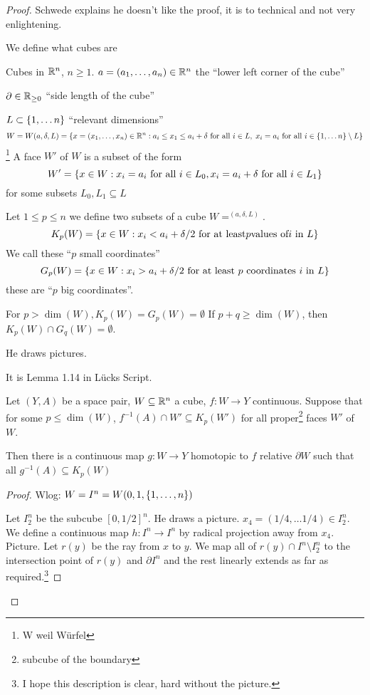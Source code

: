 \documentclass[language=english]{TemplateLecture}
\begin{document}
\begin{proof}
    Schwede explains he doesn't like the proof, it is to technical and not very enlightening.

    We define what cubes are

    Cubes in \(\mathbb{R}^n\), \(n \geq 1\).
    \(a = (a_1, \dots, a_n) \in \mathbb{R}^n\) the \enquote{lower left corner of the cube}

    \(\partial \in \mathbb{R}_{\geq 0}\) \enquote{side length of the cube}

    \(L \subset \{1, \dots n\}\) \enquote{relevant dimensions}
    \[W = W(a, \delta, L) = \{x = (x_1, \dots, x_n)\in \mathbb{R}^n : a_i\leq x_1\leq a_i + \delta \text{ for all } i \in L, \; x_i = a_i \text{ for all } i \in \{1, \dots n\} \setminus L\}\]\footnote{W weil Würfel}
    A face \(W'\) of \(W\) is a subset of the form
    \[W' = \{x \in W : x_i = a_i \text{ for all } i \in L_0, x_i = a_i + \delta \text{ for all } i \in L_1\}\]
    for some subsets \(L_0, L_1 \subseteq L\)

    Let \(1 \leq p \leq n\) we define two subsets of a cube \(W = ^(a, \delta, L)\).
    \[K_p(W) = \{x \in W : x_i < a_i + \delta/2 \text{ for at least} p \text{values of} i \text{ in } L\}\]
    We call these \enquote{\(p\) small coordinates}
    \[G_p(W) = \{x \in W : x_i > a_i + \delta/2 \text{ for at least } p \text{ coordinates } i \text{ in } L\}\]
    these are \enquote{\(p\) big coordinates}.

    For \(p > \dim(W), K_p(W) = G_p(W)= \emptyset \) If \(p+ q \geq \dim(W)\), then \(K_p(W) \cap G_q(W) = \emptyset\).

    He draws pictures.

    \begin{lem}{1.14}{1.14}
        It is Lemma 1.14 in Lücks Script.

        Let \((Y,A)\) be a space pair, \(W \subseteq \mathbb{R}^n\) a cube, \(f \colon W \to Y\) continuous. Suppose that for some \(p\leq \dim(W)\), \(f^{-1}(A) \cap W' \subseteq K_p(W')\) for all proper\footnote{subcube of the boundary} faces \(W'\) of \(W\).
        
        Then there is a continuous map \(g \colon W \to Y\) homotopic to \(f\) relative \(\partial W\) such that all \(g^{-1}(A)\subseteq K_p(W)\)
    \end{lem}
    \begin{proof}
        Wlog: \(W = I^n = W(0, 1, \{1,\dots ,n\})\)

        Let \(I_2^n\) be the subcube \([0, 1/2]^n\). He draws a picture. \(x_4 = (1/4, \dots 1/4) \in I_2^n\). We define a continuous map \(h \colon I^n \to I^n\) by radical projection away from \(x_4\). Picture. Let \(r(y)\) be the ray from \(x\) to \(y\). We map all of \(r(y) \cap I^n\setminus I^n_2\) to the intersection point of \(r(y)\) and \(\partial I^n\) and the rest linearly extends as far as required.\footnote{I hope this description is clear, hard without the picture.}


\end{proof}
\end{proof}
\end{document}
